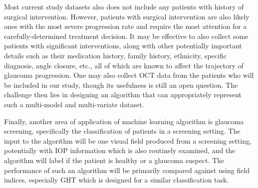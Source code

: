 Most current study datasets also does not include any patients with history of surgical intervention. However, patients with surgical intervention are also likely ones with the most severe progression rate and require the most attention for a carefully-determined treatment decision. It may be effective to also collect some patients with significant interventions, along with other potentially important details such as their medication history, family history, ethnicity, specific diagnosis, angle closure, etc., all of which are known to affect the trajectory of glaucoma progression. One may also collect \ac{OCT} data from the patients who will be included in our study, though its usefulness is still an open question. The challenge then lies in designing an algorithm that can appropriately represent such a multi-model and multi-variate dataset. 

Finally, another area of application of machine learning algorithm is glaucoma screening, specifically the classification of patients in a screening setting. The input to the algorithm will be one visual field produced from a screening setting, potentially with \ac{IOP} information which is also routinely examined, and the algorithm will label if the patient is healthy or a glaucoma suspect. The performance of such an algorithm will be primarily compared against using field indices, especially \ac{GHT} which is designed for a similar classification task. 
